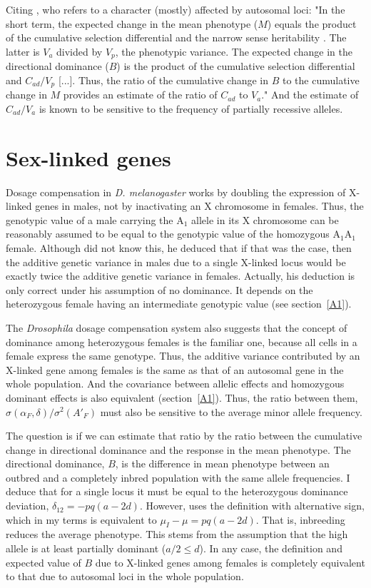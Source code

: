 \documentclass[a4paper,12pt]{article}
\begin{document}
Citing \citet{Kelly1999}, who refers to a character (mostly) affected by autosomal loci: "In the short term, the expected change in the mean phenotype ($M$) equals the product of the cumulative selection differential and the narrow sense heritability \citep{Falconer1989}. The latter is $V_a$ divided by $V_p$, the phenotypic variance. The expected change in the directional dominance ($B$) is the product of the cumulative selection differential and $C_{ad} / V_p$ [...]. Thus, the ratio of the cumulative change in $B$ to the cumulative change in $M$ provides an estimate of the ratio of $C_{ad}$ to $V_a$." And the estimate of $C_{ad}/V_a$ is known to be sensitive to the frequency of partially recessive alleles.

\section{Sex-linked genes}
Dosage compensation in \emph{D. melanogaster} works by doubling the expression of X-linked genes in males, not by inactivating an X chromosome in females. Thus, the genotypic value of a male carrying the A$_1$ allele in its X chromosome can be reasonably assumed to be equal to the genotypic value of the homozygous A$_1$A$_1$ female. Although \citet{James1973} did not know this, he deduced that if that was the case, then the additive genetic variance in males due to a single X-linked locus would be exactly twice the additive genetic variance in females. Actually, his deduction is only correct under his assumption of no dominance. It depends on the heterozygous female having an intermediate genotypic value (see section~\ref{A1}).

The \emph{Drosophila} dosage compensation system also suggests that the concept of dominance among heterozygous females is the familiar one, because all cells in a female express the same genotype. Thus, the additive variance contributed by an X-linked gene among females is the same as that of an autosomal gene in the whole population. And the covariance between allelic effects and homozygous dominant effects is also equivalent (section~\ref{A1}). Thus, the ratio between them, $\sigma(\alpha_F, \delta)/\sigma^2(A'_F)$ must also be sensitive to the average minor allele frequency.

The question is if we can estimate that ratio by the ratio between the cumulative change in directional dominance and the response in the mean phenotype. The directional dominance, $B$, is the difference in mean phenotype between an outbred and a completely inbred population with the same allele frequencies. I deduce that for a single locus it must be equal to the heterozygous dominance deviation, $\delta_{12}=-pq(a-2d)$. However, \citet{Kelly1999} uses the definition with alternative sign, which in my terms is equivalent to $\mu_I - \mu = pq(a-2d)$. That is, inbreeding reduces the average phenotype. This stems from the assumption that the high allele is at least partially dominant ($a/2 \leq d$). In any case, the definition and expected value of $B$ due to X-linked genes among females is completely equivalent to that due to autosomal loci in the whole population.
\end{document}
